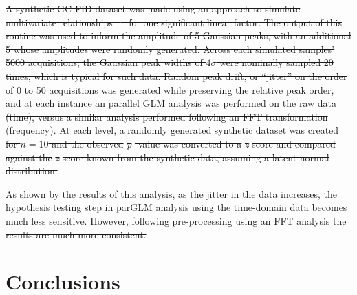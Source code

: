 \documentclass[preprint,12pt]{elsarticle}
\providecommand{\DIFdel}[1]{{\protect\color{red}\sout{#1}}}                      %
\providecommand{\DIFdelend}{} %
\providecommand{\DIFdelFL}[1]{\DIFdel{#1}} %
\begin{document}
\DIFdel{A synthetic GC-FID dataset was made using an approach to simulate multivariate relationships \mbox{%
\cite{Camacho2016} }\hskip0pt%
for one significant linear factor. The output of this routine was used to inform the amplitude of 5 Gaussian peaks, with an additional 5 whose amplitudes were randomly generated. Across each simulated samples' 5000 acquisitions, the Gaussian peak widths of $4\sigma$ were nominally sampled 20 times, which is typical for such data. Random peak drift, or ``jitter'' on the order of 0 to 50 acquisitions was generated while preserving the relative peak order, and at each instance an parallel GLM analysis was performed on the raw data (time), versus a similar analysis performed following an FFT transformation (frequency). At each level, a randomly generated synthetic dataset was created for $n=10$ and the observed }\textit{\DIFdel{p}}%
\DIFdel{-value was converted to a }\textit{\DIFdel{z}} %
\DIFdel{score and compared against the }\textit{\DIFdel{z}} %
\DIFdel{score known from the synthetic data, assuming a latent normal distribution.
}%

{%
\DIFdelFL{As shown by the results of this analysis, as the jitter in the data increases, the hypothesis testing step in parGLM analysis using the time-domain data becomes much less sensitive. However, following pre-processing using an FFT analysis the results are much more consistent.}}

\DIFdelend \section{Conclusions}
\end{document}
